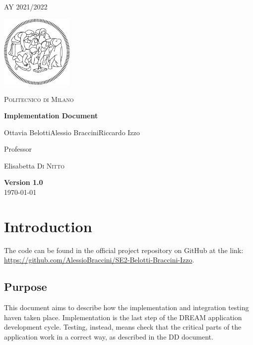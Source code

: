 \documentclass[table, 12pt]{article}
\begin{document}
\begin{titlepage}
    \centering
    {\scshape\large AY 2021/2022 \par}
    \vfill
    \includegraphics[width=100pt]{assets/logo-polimi-new.pdf}\par\vspace{1cm}
    {\scshape\LARGE Politecnico di Milano \par}
    \vspace{1.5cm}
    {\huge\bfseries Implementation Document \par}
    \vspace{2cm}
    {\Large {Ottavia Belotti\quad Alessio Braccini\quad Riccardo Izzo}\par}
    \vfill
    {\large Professor\par
        Elisabetta \textsc{Di Nitto}}
    \vfill
    {\large \textbf{Version 1.0}\\ \today \par}
\end{titlepage}


\thispagestyle{plain}
\mbox{}
\newpage
{}
\tableofcontents
\newpage
{}

\section{Introduction}
The code can be found in the official project repository on GitHub at the link: \url{https://github.com/AlessioBraccini/SE2-Belotti-Braccini-Izzo}.
\subsection{Purpose}

This document aims to describe how the implementation and integration
testing haven taken place.
Implementation is the last step of the DREAM application
development cycle.
Testing, instead, means check that the critical parts of the application
work in a correct way, as described in the DD document.
\end{document}
